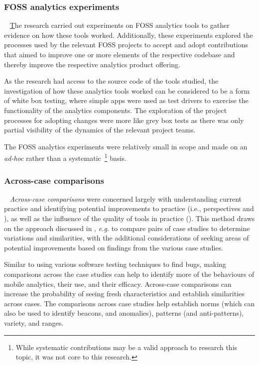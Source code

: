\subsubsection{FOSS analytics experiments}~\label{foss-contributions-research-methods}
\href{glossary-FOSS}The research carried out experiments on {FOSS} analytics tools to gather evidence on how these tools worked. Additionally, these experiments explored the processes used by the relevant FOSS projects to accept and adopt contributions that aimed to improve one or more elements of the respective codebase and thereby improve the respective analytics product offering.

As the research had access to the source code of the tools studied, the investigation of how these analytics tools worked can be considered to be a form of white box testing, where simple apps were used as test drivers to exercise the functionality of the analytics components. The exploration of the project processes for adopting changes were more like grey box tests as there was only partial visibility of the dynamics of the relevant project teams. 

The FOSS analytics experiments were relatively small in scope and made on an \emph{ad-hoc} rather than a systematic~\footnote{While systematic contributions may be a valid approach to research this topic, it was not core to this research.} basis.


\subsubsection{Across-case comparisons}~\label{across-case-comparisons-research-method}
\textit{Across-case comparisons} were concerned largely with understanding current practice and identifying potential improvements to practice (i.e., perspectives \uuse and \iuse), as well as the influence of the quality of tools in practice (\itools). This method draws on the approach discussed in \citet[pp. 567-569]{seaman1999_qualitative_methods_in_esse}, \textit{e.g.} to compare pairs of case studies to determine variations and similarities, with the additional considerations of seeking areas of potential improvements based on findings from the various case studies.

Similar to using various software testing techniques to find bugs, making comparisons across the case studies can help to identify more of the behaviours of mobile analytics, their use, and their efficacy. Across-case comparisons can increase the probability of seeing fresh characteristics and establish similarities across cases. The comparisons across case studies help establish norms (which can also be used to identify beacons, and anomalies), patterns (and anti-patterns), variety, and ranges. 

